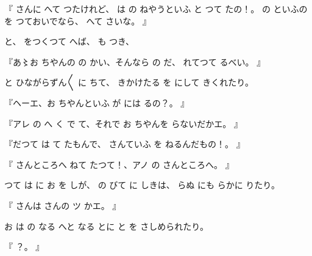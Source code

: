 『
さんに
へて
つたけれど、
は
の
ねやうといふ
と
つて
たの！。
の
といふのを
つておいでなら、
へて
さいな。
』

と、
をつくつて
へば、
も
つき、

『あ〻お
ちやんの
の
かい、そんなら
の
だ、
れてつて
るべい。
』

と
ひながらずん〳〵
に
ちて、
きかけたる
を
にして
きくれたり。

『ヘーエ、お
ちやんといふ
が
には
るの？。
』

『アレ
の
へ
く
で
て、それで
お
ちやんを
らないだかエ。
』

『だつて
は
て
たもんで、
さんていふ
を
ねるんだもの！。
』

『
さんところへ
ねて
たつて！、アノ
の
さんところへ。
』

つて
は
に
お
を
しが、
の
びて
に
しきは、
らぬ
にも
らかに
りたり。

『
さんは
さんの
ツ
かエ。
』

お
は
の
なる
へと
なる
とに
と
を
さしめられたり。

『
？。
』

